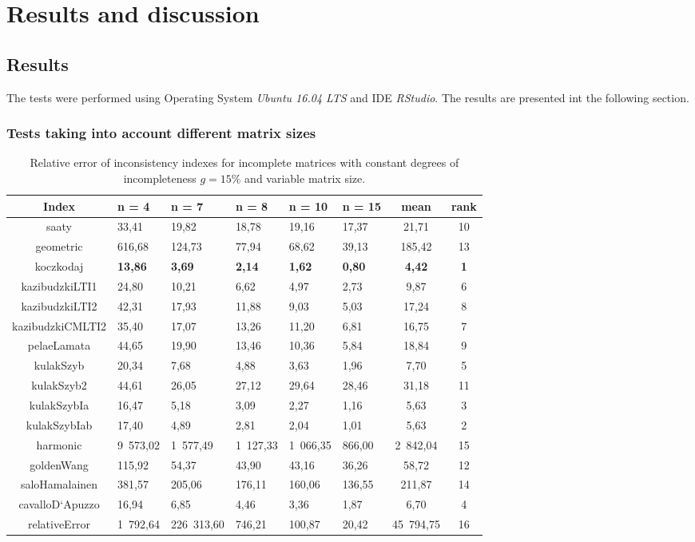 \chapter{Results and discussion}
\label{sec:results}
\section{Results}
The tests were performed using Operating System \textit{Ubuntu 16.04 LTS} and IDE \textit{RStudio}. The results are presented int the following section.

\subsection{Tests taking into account different matrix sizes}
\begin{table}[h]
\begin{center}
\caption{Relative error of inconsistency indexes for incomplete matrices with constant degrees of incompleteness $g=15\%$ and variable matrix size.}
\label{tab:results1}
\begin{tabular}{|c||l|l|l|l|l|c||c|}
\hline Index & n = 4 & n = 7 & n = 8 & n = 10 & n = 15 & mean & rank \\ \hline \hline
saaty & 33,41 & 19,82 & 18,78 & 19,16 & 17,37 & 21,71 & 10 \\ \hline
geometric & 616,68 & 124,73 & 77,94 & 68,62 & 39,13 & 185,42 & 13 \\ \hline
koczkodaj & \textbf{13,86} & \textbf{3,69} & \textbf{2,14} & \textbf{1,62} & \textbf{0,80} & \textbf{4,42} & \textbf{1} \\ \hline
kazibudzkiLTI1 & 24,80 & 10,21 & 6,62 & 4,97 & 2,73 & 9,87 & 6 \\ \hline
kazibudzkiLTI2 & 42,31 & 17,93 & 11,88 & 9,03 & 5,03 & 17,24 & 8 \\ \hline
kazibudzkiCMLTI2 & 35,40 & 17,07 & 13,26 & 11,20 & 6,81 & 16,75 & 7 \\ \hline
pelaeLamata & 44,65 & 19,90 & 13,46 & 10,36 & 5,84 & 18,84 & 9 \\ \hline
kulakSzyb & 20,34 & 7,68 & 4,88 & 3,63 & 1,96 & 7,70 & 5 \\ \hline
kulakSzyb2 & 44,61 & 26,05 & 27,12 & 29,64 & 28,46 & 31,18 & 11 \\ \hline
kulakSzybIa & 16,47 & 5,18 & 3,09 & 2,27 & 1,16 & 5,63 & 3 \\ \hline
kulakSzybIab & 17,40 & 4,89 & 2,81 & 2,04 & 1,01 & 5,63 & 2 \\ \hline
harmonic & 9 573,02 & 1 577,49 & 1 127,33 & 1 066,35 & 866,00 & 2 842,04 & 15 \\ \hline
goldenWang & 115,92 & 54,37 & 43,90 & 43,16 & 36,26 & 58,72 & 12 \\ \hline
saloHamalainen & 381,57 & 205,06 & 176,11 & 160,06 & 136,55 & 211,87 & 14 \\ \hline
cavalloD`Apuzzo & 16,94 & 6,85 & 4,46 & 3,36 & 1,87 & 6,70 & 4 \\ \hline
relativeError & 1 792,64 & 226 313,60 & 746,21 & 100,87 & 20,42 & 45 794,75 & 16 \\ \hline
\end{tabular}
\end{center}
\end{table}

